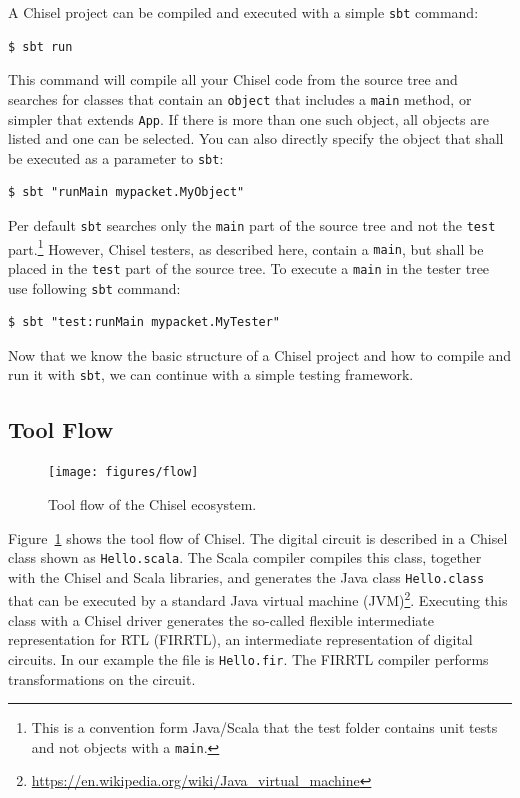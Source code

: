 \documentclass[%
    10pt,
    headinclude, footexclude,
    openright, %
    notitlepage,
    cleardoubleempty,
    headsepline,
    pointlessnumbers,
    bibtotoc, idxtotoc,
    ]{scrbook}
\newcommand{\code}[1]{{\small{\texttt{#1}}}}
\newcommand{\codefoot}[1]{{\footnotesize{\texttt{#1}}}}
\newcommand{\myref}[2]{\href{#1}{#2}}
\renewcommand{\myref}[2]{{#2}{\footnote{\url{#1}}}}
\begin{document}
A Chisel project can be compiled and executed with a simple \code{sbt} command:

\begin{verbatim}
$ sbt run
\end{verbatim}

This command will compile all your Chisel code from the source tree and searches
for classes that contain an \code{object} that includes a \code{main} method, or simpler
that extends \code{App}. If there is more than one such object, all objects are listed and
one can be selected.
You can also directly specify the object that shall be executed as a parameter to \code{sbt}:

\begin{verbatim}
$ sbt "runMain mypacket.MyObject"
\end{verbatim}

Per default \code{sbt} searches only the \code{main} part of the source tree and not
the \code{test} part.\footnote{This is a convention form Java/Scala that the test folder contains
unit tests and not objects with a \codefoot{main}.} However, Chisel testers, as described here,
contain a \code{main}, but shall be placed in the \code{test} part of the source tree.
To execute a \code{main} in the tester tree use following \code{sbt} command:

\begin{verbatim}
$ sbt "test:runMain mypacket.MyTester"
\end{verbatim}

Now that we know the basic structure of a Chisel project and how to compile and run it
with \code{sbt}, we can continue with a simple testing framework.

\subsection{Tool Flow}

\begin{figure}
  \centering
  \texttt{[image: figures/flow]}
  \caption{Tool flow of the Chisel ecosystem.}
  \label{fig:flow}
\end{figure}

Figure~\ref{fig:flow} shows the tool flow of Chisel. The digital circuit is described in a Chisel class
shown as \code{Hello.scala}. The Scala compiler compiles this class, together with the Chisel and Scala
libraries, and generates the Java class \code{Hello.class} that can be executed by a standard
\myref{https://en.wikipedia.org/wiki/Java_virtual_machine}{Java virtual machine (JVM)}.
Executing this class with a Chisel driver generates the so-called flexible intermediate representation for
RTL (FIRRTL), an intermediate representation of digital circuits. In our example the file is \code{Hello.fir}.
The FIRRTL compiler performs transformations on the circuit.
\end{document}
